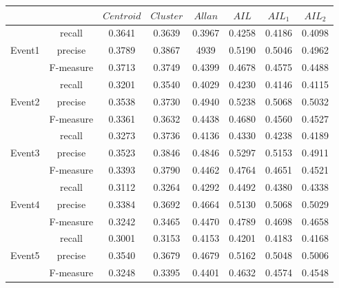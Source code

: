 \documentclass[runningheads,a4paper]{llncs}
\begin{document}
\begin{tabular}{c|c c c c c c c}
\hline
                  &             		& $Centroid$ & $Cluster$ & $Allan$    & $AIL$       & $AIL_1$    & $AIL_2$ \\
\hline
                 &  recall		& 0.3641     & 0.3639 & 0.3967 & 0.4258 & 0.4186 & 0.4098 \\
Event1   &  precise		& 0.3789     & 0.3867 & 4939    & 0.5190 & 0.5046 & 0.4962 \\
	       &  F-measure	& 0.3713     & 0.3749 & 0.4399 & 0.4678 & 0.4575 & 0.4488 \\
\hline
                 &  recall 		& 0.3201     & 0.3540 & 0.4029 & 0.4230 & 0.4146 & 0.4115 \\
Event2   &  precise 		& 0.3538     & 0.3730 & 0.4940 & 0.5238 & 0.5068 & 0.5032 \\
	       &  F-measure 	& 0.3361     & 0.3632 & 0.4438 & 0.4680 & 0.4560 & 0.4527 \\
\hline
                 &  recall 		& 0.3273     & 0.3736 & 0.4136 & 0.4330 & 0.4238 & 0.4189 \\
Event3   &  precise 		& 0.3523     & 0.3846 & 0.4846 & 0.5297 & 0.5153 & 0.4911 \\
	       &  F-measure 	& 0.3393     & 0.3790 & 0.4462 & 0.4764 & 0.4651 & 0.4521 \\
\hline
                 &  recall 		& 0.3112     & 0.3264 & 0.4292 & 0.4492 & 0.4380 & 0.4338 \\
Event4   &  precise 		& 0.3384     & 0.3692 & 0.4664 & 0.5130 & 0.5068 & 0.5029 \\
	       &  F-measure 	& 0.3242     & 0.3465 & 0.4470 & 0.4789 & 0.4698 & 0.4658 \\
\hline
                 &  recall 		& 0.3001     & 0.3153 & 0.4153 & 0.4201 & 0.4183 & 0.4168 \\
Event5   &  precise 		& 0.3540     & 0.3679 & 0.4679 & 0.5162 & 0.5048 & 0.5006 \\
	       &  F-measure 	& 0.3248     & 0.3395 & 0.4401 & 0.4632 & 0.4574 & 0.4548 \\
\hline

\end{tabular}
\end{document}
